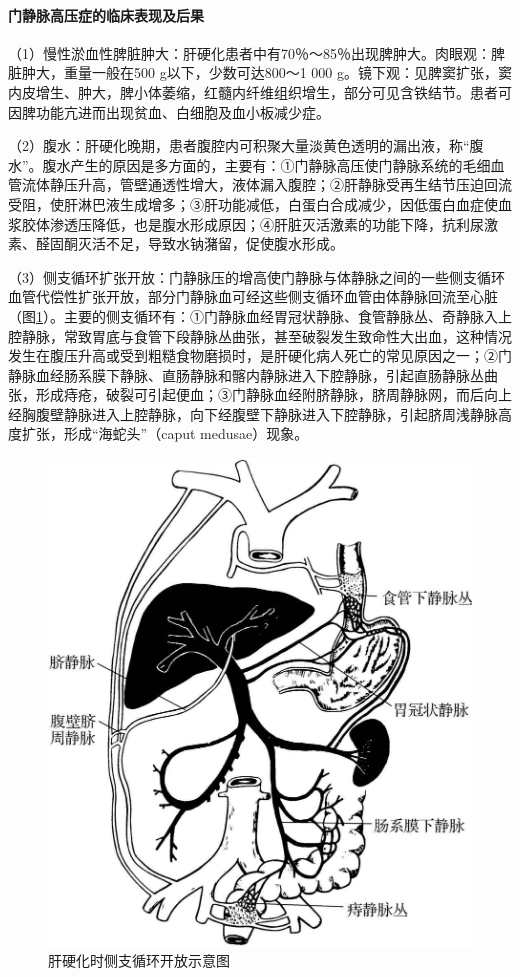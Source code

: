 \paragraph{门静脉高压症的临床表现及后果}
（1）慢性淤血性脾脏肿大：肝硬化患者中有70％～85％出现脾肿大。肉眼观：脾脏肿大，重量一般在500
g以下，少数可达800～1 000
g。镜下观：见脾窦扩张，窦内皮增生、肿大，脾小体萎缩，红髓内纤维组织增生，部分可见含铁结节。患者可因脾功能亢进而出现贫血、白细胞及血小板减少症。

（2）腹水：肝硬化晚期，患者腹腔内可积聚大量淡黄色透明的漏出液，称“腹水”。腹水产生的原因是多方面的，主要有：①门静脉高压使门静脉系统的毛细血管流体静压升高，管壁通透性增大，液体漏入腹腔；②肝静脉受再生结节压迫回流受阻，使肝淋巴液生成增多；③肝功能减低，白蛋白合成减少，因低蛋白血症使血浆胶体渗透压降低，也是腹水形成原因；④肝脏灭活激素的功能下降，抗利尿激素、醛固酮灭活不足，导致水钠潴留，促使腹水形成。

（3）侧支循环扩张开放：门静脉压的增高使门静脉与体静脉之间的一些侧支循环血管代偿性扩张开放，部分门静脉血可经这些侧支循环血管由体静脉回流至心脏（图\ref{fig8-11}）。主要的侧支循环有：①门静脉血经胃冠状静脉、食管静脉丛、奇静脉入上腔静脉，常致胃底与食管下段静脉丛曲张，甚至破裂发生致命性大出血，这种情况发生在腹压升高或受到粗糙食物磨损时，是肝硬化病人死亡的常见原因之一；②门静脉血经肠系膜下静脉、直肠静脉和髂内静脉进入下腔静脉，引起直肠静脉丛曲张，形成痔疮，破裂可引起便血；③门静脉血经附脐静脉，脐周静脉网，而后向上经胸腹壁静脉进入上腔静脉，向下经腹壁下静脉进入下腔静脉，引起脐周浅静脉高度扩张，形成“海蛇头”（caput
medusae）现象。

\begin{figure}[!htbp]
 \centering
 \includegraphics{./images/Image00139.jpg} 
 \captionsetup{justification=centering}
 \caption{肝硬化时侧支循环开放示意图}
 \label{fig8-11}
  \end{figure} 

